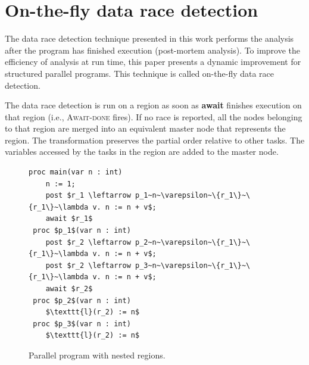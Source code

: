 \section{On-the-fly data race detection}
The data race detection technique presented in this work performs the analysis after the program has finished execution (post-mortem analysis). To improve the efficiency of analysis at run time, this paper presents a dynamic improvement for structured parallel programs. This technique is called on-the-fly data race detection.

The data race detection is run on a region as soon as \textbf{await} finishes execution on that region (i.e., \textsc{Await-done} fires). If no race is reported, all the nodes belonging to that region are merged into an equivalent master node that represents the region. The transformation preserves the partial order relative to other tasks. The variables accessed by the tasks in the region are added to the master node. 

\begin{figure}
  \begin{center}
    \begin{lstlisting}[mathescape=true]
  proc main(var n : int)
  	n := 1;
  	post $r_1 \leftarrow p_1~n~\varepsilon~\{r_1\}~\{r_1\}~\lambda v. n := n + v$;
	await $r_1$
 proc $p_1$(var n : int)
 	post $r_2 \leftarrow p_2~n~\varepsilon~\{r_1\}~\{r_1\}~\lambda v. n := n + v$;
  	post $r_2 \leftarrow p_3~n~\varepsilon~\{r_1\}~\{r_1\}~\lambda v. n := n + v$;  	  	
	await $r_2$
 proc $p_2$(var n : int)
	$\texttt{l}(r_2) := n$ 
 proc $p_3$(var n : int)
	$\texttt{l}(r_2) := n$
\end{lstlisting}
  \end{center}
    \vspace{-2em}
  \caption{Parallel program with nested regions.}
  \label{fig:nested-regions}
\end{figure}

